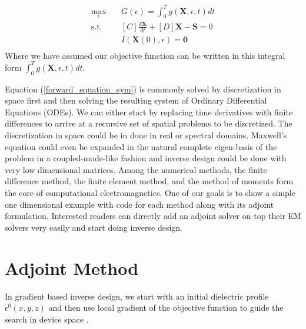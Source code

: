 \documentclass{tufte-handout}
\begin{document}
  \begin{equation}
  \begin{aligned}
  \max_{\epsilon} \quad & G(\epsilon) = \int^T_0 g(\mathbf{X},\epsilon,t) dt \\
  \textrm{s.t.} \quad & [C] \frac{d \mathbf{X}}{dt} + [D] \mathbf{X} - \mathbf{S} = 0\\
  &I(\mathbf{X}(0),\epsilon) = \mathbf{0}   \\
  \end{aligned}
  \end{equation}
 Where we have assumed our objective function can be written in this integral form $\int^T_0 g(\mathbf{X},\epsilon,t) dt$. 
 
 Equation (\ref{forward_equation_sym}) is  commonly solved by discretization  in space first and then solving the resulting system of Ordinary Differential Equations (ODEs). We can either start by replacing time derivatives with finite differences to arrive at a recursive set of spatial problems to be discretized. The discretization in space could be in done in real or spectral domains. Maxwell's equation could even be expanded in the natural complete eigen-basis of the problem in a coupled-mode-like fashion and inverse design could be done with very low dimensional matrices.   Among the numerical methods, the finite difference method, the finite element
 method, and the method of moments form the core of computational electromagnetics. One of our goals is to show a simple one dimensional example with code for each method  along with its adjoint formulation. Interested readers can directly add an adjoint solver on top their EM solvers very easily and start doing inverse design. 
 \section{Adjoint Method}
 In gradient based inverse design, we start with an initial dielectric profile $\epsilon^{0}(x,y,z)$  and then use local  gradient of the objective function to guide the search in device space . 
\end{document}
